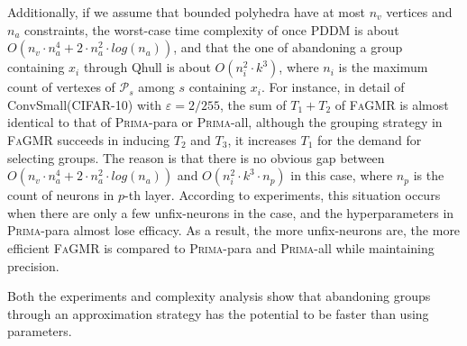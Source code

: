 \documentclass[runningheads]{llncs}
\newcommand{\ourtool}{\textsc{FaGMR}\xspace}
\newcommand{\prima}{\textsc{Prima}\xspace}
\newcommand{\cifar}{CIFAR-10\xspace}
\begin{document}
Additionally, if we assume that bounded polyhedra have at most $n_{v}$ vertices and $n_{a}$ constraints,  the worst-case time complexity of once PDDM is about $O(n_{v}\cdot n_{a}^{4}+2 \cdot n_{a}^{2} \cdot log(n_{a}))$,
and that the one of abandoning a group containing $x_{i}$ through Qhull is about
$O(n^{2}_{i} \cdot k^{3})$, where $n_{i}$ is the maximum count of vertexes of $\mathcal{P}_{s}$ among $s$ containing $x_{i}$.
For instance, in detail of ConvSmall(\cifar) with $\varepsilon=2/255$, the sum of $T_{1}+T_{2}$ of \ourtool is almost identical to that of \prima-para or \prima-all, although the grouping strategy in \ourtool succeeds in inducing $T_{2}$ and $T_{3}$, it increases $T_{1}$ for the demand for selecting groups. The reason is that there is no obvious gap between $O(n_{v}\cdot n_{a}^{4}+2\cdot n_{a}^{2}\cdot log(n_{a}))$ and $O(n_{i}^{2}\cdot k^{3} \cdot n_{p})$ in this case, where $n_{p}$ is the count of neurons in $p$-th layer. According to experiments, this situation occurs when there are only a few unfix-neurons in the case, and the hyperparameters in \prima-para almost lose efficacy. As a result, the more unfix-neurons are, the more efficient \ourtool is compared to \prima-para and \prima-all while maintaining precision.

Both the experiments and complexity analysis show that 
abandoning groups through an approximation strategy
has the potential to be faster than using parameters.

%
%
\end{document}
